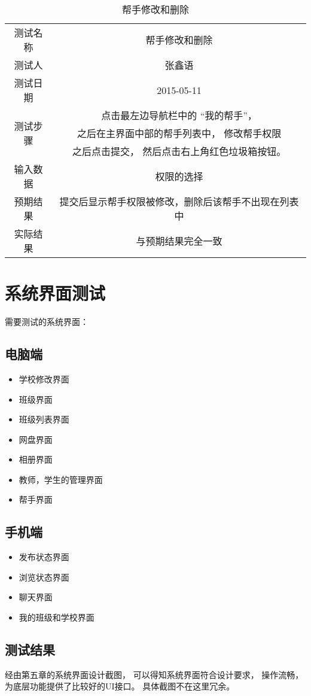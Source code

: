\begin{table}[H]
  \centering
  \caption{帮手修改和删除}
  \label{tab:12}
  \begin{tabular}{cc}
    \toprule
    测试名称 & 帮手修改和删除  \\

    测试人 & 张鑫语 \\
    测试日期 & 2015-05-11 \\

    \midrule
    \multirow{3}{*}{测试步骤} 		& 点击最左边导航栏中的 “我的帮手”， \\
             & 之后在主界面中部的帮手列表中， 修改帮手权限 \\
             & 之后点击提交， 然后点击右上角红色垃圾箱按钮。 \\
    \midrule
    输入数据 		& 权限的选择 \\
    预期结果 		& 提交后显示帮手权限被修改，删除后该帮手不出现在列表中 \\
    实际结果             & 与预期结果完全一致 \\
    \bottomrule
  \end{tabular}
\end{table}




\section{系统界面测试}



需要测试的系统界面：

\subsection{电脑端}

\begin{itemize}
\item 学校修改界面
\item 班级界面
\item 班级列表界面
\item 网盘界面
\item 相册界面
\item 教师，学生的管理界面
\item 帮手界面
\end{itemize}

\subsection{手机端}

\begin{itemize}
\item 发布状态界面
\item 浏览状态界面
\item 聊天界面
\item 我的班级和学校界面
\end{itemize}


\subsection{测试结果}

经由第五章的系统界面设计截图， 可以得知系统界面符合设计要求， 操作流畅， 为底层功能提供了比较好的UI接口。 具体截图不在这里冗余。
